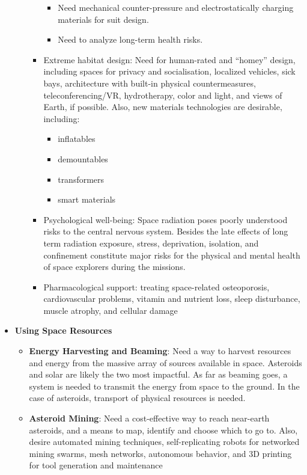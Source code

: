 \documentclass[letter,11pt]{article}
\begin{document}
\begin{itemize}
\begin{itemize}
\begin{itemize}
\begin{itemize}
							\item Need mechanical counter-pressure and electrostatically charging materials for suit design.
							\item Need to analyze long-term health risks.
						\end{itemize}
					\item Extreme habitat design: Need for human-rated and ``homey'' design, including spaces for privacy and socialisation, localized vehicles, sick bays, architecture with built-in physical countermeasures, teleconferencing/VR, hydrotherapy, color and light, and views of Earth, if possible. Also, new materials technologies are desirable, including: \begin{itemize} \item inflatables \item demountables \item transformers \item smart materials \end{itemize}
					\item Psychological well-being: Space radiation poses poorly understood risks to the central nervous system. Besides the late effects of long term radiation exposure, stress, deprivation, isolation, and confinement constitute major risks for the physical and mental health of space explorers during the missions.
					\item Pharmacological support: treating space-related osteoporosis, cardiovascular problems, vitamin and nutrient loss, sleep disturbance, muscle atrophy, and cellular damage
				\end{itemize}
		\end{itemize}
	\item \textbf{Using Space Resources} \begin{itemize}
			\item \textbf{Energy Harvesting and Beaming}: Need a way to harvest resources and energy from the massive array of sources available in space. Asteroids and solar are likely the two most impactful.  As far as beaming goes, a system is needed to transmit the energy from space to the ground.  In the case of asteroids, transport of physical resources is needed.
			\item \textbf{Asteroid Mining}: Need a cost-effective way to reach near-earth asteroids, and a means to map, identify and choose which to go to. Also, desire automated mining techniques, self-replicating robots for networked mining swarms, mesh networks, autonomous behavior, and 3D printing for tool generation and maintenance

\end{itemize}
\end{itemize}
\end{document}
